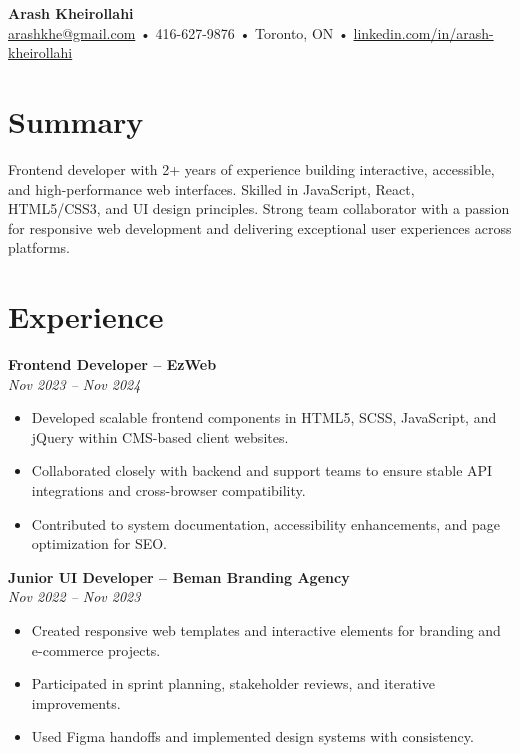 \documentclass[letterpaper,11pt]{article}
\begin{document}

{\LARGE \textbf{Arash Kheirollahi}}\\
\href{mailto:arashkhe@gmail.com}{arashkhe@gmail.com} • 416-627-9876 • Toronto, ON • \href{https://linkedin.com/in/arash-kheirollahi}{linkedin.com/in/arash-kheirollahi}

\vspace{1.2em}

\section*{Summary}
Frontend developer with 2+ years of experience building interactive, accessible, and high-performance web interfaces. Skilled in JavaScript, React, HTML5/CSS3, and UI design principles. Strong team collaborator with a passion for responsive web development and delivering exceptional user experiences across platforms.

\vspace{0.6em}

\section*{Experience}
\textbf{Frontend Developer – EzWeb}\\
\textit{Nov 2023 -- Nov 2024}\\
\begin{itemize}[leftmargin=*]
  \item Developed scalable frontend components in HTML5, SCSS, JavaScript, and jQuery within CMS-based client websites.
  \item Collaborated closely with backend and support teams to ensure stable API integrations and cross-browser compatibility.
  \item Contributed to system documentation, accessibility enhancements, and page optimization for SEO.
\end{itemize}

\vspace{0.6em}

\textbf{Junior UI Developer – Beman Branding Agency}\\
\textit{Nov 2022 -- Nov 2023}\\
\begin{itemize}[leftmargin=*]
  \item Created responsive web templates and interactive elements for branding and e-commerce projects.
  \item Participated in sprint planning, stakeholder reviews, and iterative improvements.
  \item Used Figma handoffs and implemented design systems with consistency.
\end{itemize}
\end{document}
